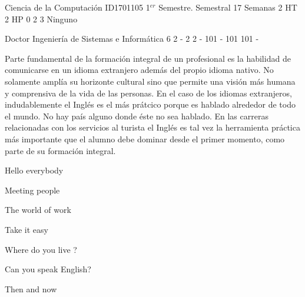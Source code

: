 \documentclass[a4paper,8pt]{article}
\begin{document}
\setNombreProfesor{}
\setGradoProfesorAbreviado{}
\sylabusHeader

\academicaTable
{Ciencia de la Computación} %
{ID1701105} %
{1$^{er}$ Semestre.} %
{Semestral} %
{17 Semanas} %
{2 HT} %
{2 HP} %
{0} %
{}  %
{2} %
{3} %
{Ninguno} %

\administrativaTable
{Doctor} %
{Ingeniería de Sistemas e Informática} %
{6} %
{2} %
{-} %
{2} %
{2} %
{-} %
{101} %
{-} %
{101} %
{101} %
{-} %


\begin{fundamentacion}
Parte fundamental de la formación integral de un profesional es la habilidad de comunicarse en un idioma extranjero además del propio idioma nativo. No solamente amplía su horizonte cultural sino que permite una visión más humana y comprensiva de la vida de las personas. En el caso de los idiomas extranjeros, indudablemente el Inglés es el más prátcico porque es hablado alrededor de todo el mundo. No hay país alguno donde éste no sea hablado. En las carreras relacionadas con los servicios al turista el Inglés es tal vez la herramienta práctica más importante que el alumno debe dominar desde el primer momento, como parte de su formación integral.

\end{fundamentacion}

\begin{sumilla}
\item Hello everybody
\item Meeting people
\item The world of work
\item Take it easy
\item Where do you live ?
\item Can you speak English?
\item Then and now

\end{sumilla}
\end{document}
